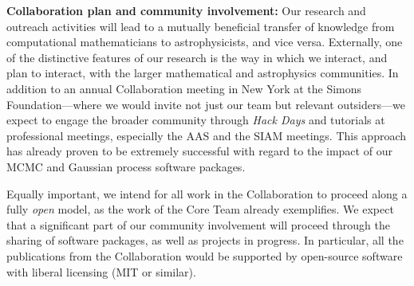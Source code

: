 \documentclass[11pt]{article}
\renewcommand{\paragraph}[1]{\smallskip\par\noindent\textbf{{#1}:}}
\begin{document}
\paragraph{Collaboration plan and community involvement}
Our research and outreach activities will lead to a mutually beneficial
transfer of knowledge from computational mathematicians to
astrophysicists, and vice versa.
Externally, one of the distinctive features of our research is the way
in which we interact, and plan to interact, with the larger mathematical
and astrophysics communities.
In addition to an annual Collaboration meeting in New York at the Simons
Foundation---where we would invite not just our team but relevant
outsiders---we expect to engage the broader community through \emph{Hack
Days} and tutorials at professional meetings, especially the AAS and the 
SIAM meetings.
This approach has already proven to be extremely successful with regard
to the impact of our MCMC and Gaussian process software packages.

Equally important, we intend for all work in the Collaboration to
proceed along a fully \emph{open} model, as the work of the Core Team
already exemplifies.
We expect that a significant part of our community involvement will
proceed through the sharing of software packages, as well as projects in
progress.
In particular, all the publications from the Collaboration would be
supported by open-source software with liberal licensing (MIT or similar).

\clearpage
\end{document}
